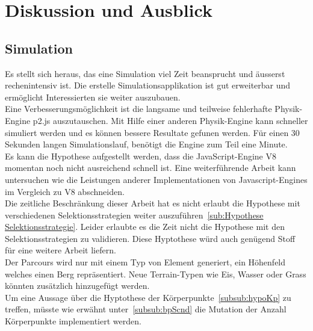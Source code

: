%
%


\chapter{Diskussion und Ausblick}


  \section{Simulation}

    Es stellt sich heraus, das eine Simulation viel Zeit beansprucht und äusserst rechenintensiv ist.
    Die erstelle Simulationsapplikation ist gut erweiterbar und ermöglicht Interessierten sie weiter auszubauen.
    \\
    Eine Verbesserungsmöglichkeit ist die langsame und teilweise fehlerhafte Physik-Engine p2.js auszutauschen.
    Mit Hilfe einer anderen Physik-Engine kann schneller simuliert werden und es können bessere Resultate gefunen werden.
    Für einen 30 Sekunden langen Simulationslauf, benötigt die Engine zum Teil eine Minute.
    \\
    Es kann die Hypothese aufgestellt werden, dass die JavaScript-Engine V8 momentan noch nicht ausreichend schnell ist.
    Eine weiterführende Arbeit kann untersuchen wie die Leistungen anderer Implementationen von Javascript-Engines im
    Vergleich zu V8 abschneiden.
    \\
    Die zeitliche Beschränkung dieser Arbeit hat es nicht erlaubt
    die Hypothese mit verschiedenen Selektionsstrategien weiter auszuführen~\ref{sub:Hypothese Selektionsstrategie}.
    Leider erlaubte es die Zeit nicht die Hypothese mit den Selektionsstrategien zu validieren.
    Diese Hyptothese würd auch genügend Stoff für eine weitere Arbeit liefern.
    \\
    Der Parcours wird nur mit einem Typ von Element generiert, ein Höhenfeld welches einen Berg repräsentiert.
    Neue Terrain-Typen wie Eis, Wasser oder Grass könnten zusätzlich hinzugefügt werden.
    \\
    Um eine Aussage über die Hyptothese der Körperpunkte~\ref{subsub:hypoKp} zu treffen,
    müsste wie erwähnt unter~\ref{subsub:bpScnd} die Mutation der Anzahl Körperpunkte implementiert werden.

